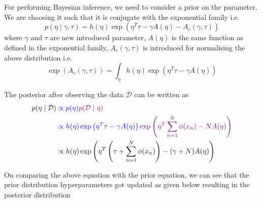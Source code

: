 \documentclass{homework}
\begin{document}
\section{}
For performing Bayesian inference, we need to consider a prior on the parameter. We are choosing it such that it is conjugate with the exponential family i.e. 
$$
p(\eta \mid \gamma, \tau) = {h(\eta)}\exp\left(\eta^T\tau - \gamma A(\eta) -A_c(\gamma, \tau)\right)
$$
where $\gamma$ and $\tau$ are new introduced parameter, $A(\eta)$ is the same function as defined in the exponential family, $A_c(\gamma, \tau)$ is introduced for normalising the above distribution i.e. 
$$
\exp(A_c (\gamma, \tau)) = \int_{\eta} h(\eta) \exp\left(\eta^T\tau - \gamma A(\eta)\right)
$$

The posterior after observing the data $\mathcal D$ can be written as
$$
\begin{aligned}
p(\eta \mid \mathcal D) &\color{blue}\propto p(\eta) \color{violet}p(\mathcal D \mid \eta)\\
&\color{blue}\propto h(\eta)\exp\left(\eta^T \tau -\gamma A(\eta)\right)\color{violet}\exp\left(\eta^T \sum_{n=1}^N \phi(x_n) - NA(\eta)\right)\\
&\propto h(\eta) \exp\left(\eta^T\left(\tau + \sum_{n=1}^N \phi(x_n)\right)  - (\gamma + N)A(\eta)\right)
\end{aligned}
$$

On comparing the above equation with the prior equation, we can see that the prior distribution hyperparameters got updated as given below resulting in the posterior distribution
\end{document}

